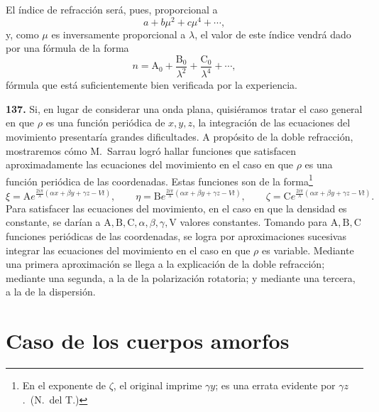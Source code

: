 El índice de refracción será, pues, proporcional a
\[
a+b\mu^2+c\mu^4+\cdots,
\]
y, como $\mu$ es inversamente proporcional a $\lambda$, el valor de este
índice vendrá dado por una fórmula de la forma
\[
n=\mathrm A_0+\frac{\mathrm B_0}{\lambda^2}+\frac{\mathrm C_0}{\lambda^4}+\cdots,
\]
fórmula que está suficientemente bien verificada por la experiencia.

\noindent\textbf{137.} Si, en lugar de considerar una onda plana,
quisiéramos tratar el caso general en que $\rho$ es una función periódica
de $x,y,z$, la integración de las ecuaciones del movimiento presentaría
grandes dificultades. A propósito de la doble refracción, mostraremos cómo
M.~Sarrau logró hallar funciones que satisfacen aproximadamente las
ecuaciones del movimiento en el caso en que $\rho$ es una función
periódica de las coordenadas. Estas funciones son de la
forma\footnote{En el exponente de $\zeta$, el original imprime
$\gamma y$; es una errata evidente por $\gamma z$.~(N.~del T.)}
\[
\xi=\mathrm Ae^{\frac{2i\pi}{\lambda}(\alpha x+\beta y+\gamma z-Vt)},\qquad
\eta=\mathrm Be^{\frac{2i\pi}{\lambda}(\alpha x+\beta y+\gamma z-Vt)},\qquad
\zeta=\mathrm Ce^{\frac{2i\pi}{\lambda}(\alpha x+\beta y+\gamma z-Vt)}.
\]
Para satisfacer las ecuaciones del movimiento, en el caso en que la
densidad es constante, se darían a $\mathrm A,\mathrm B,\mathrm C,\alpha,
\beta,\gamma,\mathrm V$ valores constantes. Tomando para $\mathrm A,
\mathrm B,\mathrm C$ funciones periódicas de las coordenadas, se logra por
aproximaciones sucesivas integrar las ecuaciones del movimiento en el caso
en que $\rho$ es variable. Mediante una primera aproximación se llega a la
explicación de la doble refracción; mediante una segunda, a la de la
polarización rotatoria; y mediante una tercera, a la de la dispersión.

\section{Caso de los cuerpos amorfos}

